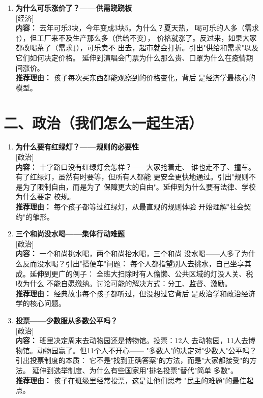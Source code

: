 \documentclass[a4paper,12pt]{ctexart}
\newcommand{\tageconomics}{\textcolor{economics}{\small [经济]}}
\newcommand{\tagpolitics}{\textcolor{politics}{\small [政治]}}
\begin{document}
\begin{enumerate}
\item[\textbf{第5课}] \textbf{为什么可乐涨价了？——供需跷跷板} \\
\tageconomics \\
\textbf{内容：} 去年可乐3块，今年变成3块5。为什么？夏天热，
喝可乐的人多（需求↑），但工厂来不及生产那么多（供给不变），
价格就涨了。反过来，如果大家都改喝茶了（需求↓），可乐卖不
出去，超市就会打折。引出"供给和需求"以及它们如何决定价格。
延伸到演唱会门票为什么那么贵、口罩为什么在疫情期间涨价。\\
\textbf{推荐理由：} 孩子每次买东西都能观察到的价格变化，背后
是经济学最核心的模型。

\end{enumerate}

\section*{\textcolor{orange!80!black}{二、政治（我们怎么一起生活）}}

\begin{enumerate}

\item[\textbf{第6课}] \textbf{为什么要有红绿灯？——规则的必要性} \\
\tagpolitics \\
\textbf{内容：} 十字路口没有红绿灯会怎样？——大家抢着走、
谁也走不了、撞车。有了红绿灯，虽然有时要等，但所有人都能
更安全更快地通过。引出"规则不是为了限制自由，而是为了
保障更大的自由"。延伸到为什么要有法律、学校为什么要定
校规。\\
\textbf{推荐理由：} 每个孩子都等过红绿灯，从最直观的规则体验
开始理解"社会契约"的雏形。

\item[\textbf{第7课}] \textbf{三个和尚没水喝——集体行动难题} \\
\tagpolitics \\
\textbf{内容：} 一个和尚挑水喝，两个和尚抬水喝，三个和尚
没水喝——人多了为什么反而没水喝？引出"搭便车"问题：
每个人都指望别人去挑水，自己坐享其成。延伸到更广的例子：
全班大扫除时有人偷懒、公共区域的灯没人关、税收为什么
不能自愿缴纳。讨论可能的解决方式：分工、监督、激励。\\
\textbf{推荐理由：} 经典故事每个孩子都听过，但没想过它背后
是政治学和政治经济学的核心问题。

\item[\textbf{第8课}] \textbf{投票——少数服从多数公平吗？} \\
\tagpolitics \\
\textbf{内容：} 班里决定周末去动物园还是博物馆。投票：12人
去动物园，11人去博物馆。动物园赢了。但11个人不开心——
"多数人"的决定对"少数人"公平吗？引出投票制度的本质：
它不是"找到正确答案"的方法，而是"大家都接受"的方法。
延伸到选举制度、为什么有些国家用"排名投票"替代"简单
多数"。\\
\textbf{推荐理由：} 孩子在班级里经常投票，这是让他们思考
"民主的难题"的最佳起点。

\end{enumerate}
\end{document}
